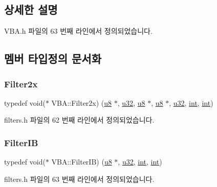 \subsection{상세한 설명}


V\+B\+A.\+h 파일의 63 번째 라인에서 정의되었습니다.



\subsection{멤버 타입정의 문서화}
\mbox{\label{class_v_b_a_accd36b6c101a516c50cf8288976739c4}} 
\subsubsection{\texorpdfstring{Filter2x}{Filter2x}}
{\footnotesize\ttfamily typedef void($\ast$ V\+B\+A\+::\+Filter2x) (\mbox{\hyperlink{_system_8h_aed742c436da53c1080638ce6ef7d13de}{u8}} $\ast$, \mbox{\hyperlink{_system_8h_a10e94b422ef0c20dcdec20d31a1f5049}{u32}}, \mbox{\hyperlink{_system_8h_aed742c436da53c1080638ce6ef7d13de}{u8}} $\ast$, \mbox{\hyperlink{_system_8h_aed742c436da53c1080638ce6ef7d13de}{u8}} $\ast$, \mbox{\hyperlink{_system_8h_a10e94b422ef0c20dcdec20d31a1f5049}{u32}}, \mbox{\hyperlink{_util_8cpp_a0ef32aa8672df19503a49fab2d0c8071}{int}}, \mbox{\hyperlink{_util_8cpp_a0ef32aa8672df19503a49fab2d0c8071}{int}})}



filters.\+h 파일의 62 번째 라인에서 정의되었습니다.

\mbox{\label{class_v_b_a_a3269ee707f37ad255f2b7b0f20921158}} 
\subsubsection{\texorpdfstring{Filter\+IB}{FilterIB}}
{\footnotesize\ttfamily typedef void($\ast$ V\+B\+A\+::\+Filter\+IB) (\mbox{\hyperlink{_system_8h_aed742c436da53c1080638ce6ef7d13de}{u8}} $\ast$, \mbox{\hyperlink{_system_8h_a10e94b422ef0c20dcdec20d31a1f5049}{u32}}, \mbox{\hyperlink{_util_8cpp_a0ef32aa8672df19503a49fab2d0c8071}{int}}, \mbox{\hyperlink{_util_8cpp_a0ef32aa8672df19503a49fab2d0c8071}{int}})}



filters.\+h 파일의 63 번째 라인에서 정의되었습니다.



